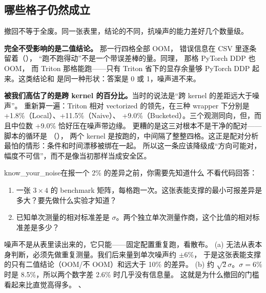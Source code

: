 \subsection{哪些格子仍然成立}
\label{subsec:survives}

撤回不等于全废。同一张表里，结论的不同，抗噪声的能力差好几个数量级。

\textbf{完全不受影响的是二值结论。} 那一行四格全部 OOM，
错误信息在 CSV 里逐条留着（），
“跑不跑得动”不是一个带误差棒的量。同理， 那格 PyTorch DDP 也 OOM，
而 Triton 那格能跑——只有 Triton 省下的显存余量够 PyTorch DDP 起来。这类结论和
 是同一种形状：答案是 0 或 1，噪声进不来。

\textbf{被我们高估了的是跨 kernel 的百分比。}当时的说法是“跨 kernel 的差距远大于噪声”。
重新算一遍：Triton 相对 vectorized 的领先，在三种 wrapper 下分别是 +1.8\%（Local）、+11.5\%（Naive）、
+9.0\%（Bucketed）。三个观测同向，但，而且中位数 +9.0\% 恰好压在噪声带边缘。
更糟的是这三对根本不是干净的配对——脚本的循环是 
（），
两个 kernel 是按跑的，中间隔了整整四格。这正是配对分析最怕的情形：条件和时间漂移被绑在一起。
所以这一条应该降级成“方向可能对，幅度不可信”，而不是像当初那样当成安全区。

\begin{checkpoint}{know_your_noise}{在报一个 2\% 的差异之前，你需要先知道什么}
不看代码回答：
\begin{enumerate}[label=(\alph*)]
  \item 一张 $3\times4$ 的 benchmark 矩阵，每格跑一次。这张表能支撑的最小可报差异是多大？要先做什么实验才知道？
  \item 已知单次测量的相对标准差是 $\sigma$。两个独立单次测量作商，这个比值的相对标准差是多少？
\end{enumerate}
\hint 噪声不是从表里读出来的，它只能——固定配置重复跑，看散布。
\ifshowanswers
\tcblower
\answer (a) 无法从表本身判断，必须先做重复测量。我们后来量到单次噪声约 $\pm$6\%，
于是这张表能支撑的只有二值结论（OOM/不 OOM）和远大于 10\% 的差异。
(b) 约 $\sqrt{2}\sigma$。$\sigma=6\%$ 时是 8.5\%，所以两个数字差 2.6\% 时几乎没有信息量。
这就是为什么撤回的门槛看起来比直觉高得多。
\whereincode {}、
\fi
\end{checkpoint}

